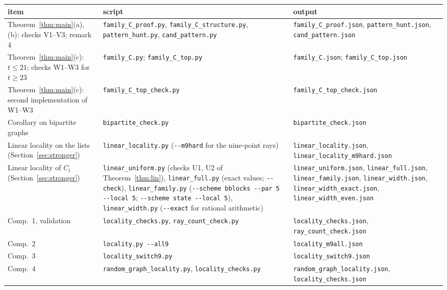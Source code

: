 \documentclass[11pt,a4paper]{article}
\theoremstyle{definition}
\theoremstyle{remark}
\newcommand{\file}[1]{\texttt{#1}}
\begin{document}
{\small\raggedright
\begin{center}
\begin{tabular}{@{}>{\raggedright\arraybackslash}p{}>{\raggedright\arraybackslash}p{}>{\raggedright\arraybackslash}p{}@{}}
\toprule
item & script & output \\
\midrule
Theorem~\ref{thm:main}(a), (b): checks V1--V3; remark 4 &
  \file{family\_C\_proof.py}, \file{family\_C\_structure.py}, \file{pattern\_hunt.py}, \file{cand\_pattern.py} &
  \file{family\_C\_proof.json}, \file{pattern\_hunt.json}, \file{cand\_pattern.json} \\
Theorem~\ref{thm:main}(c): $t \le 21$; checks W1--W3 for $t \ge 23$ &
  \file{family\_C.py}; \file{family\_C\_top.py} & \file{family\_C.json}; \file{family\_C\_top.json} \\
Theorem~\ref{thm:main}(c): second implementation of W1--W3 &
  \file{family\_C\_top\_check.py} & \file{family\_C\_top\_check.json} \\
Corollary on bipartite graphs & \file{bipartite\_check.py} & \file{bipartite\_check.json} \\
Linear locality on the lists (Section~\ref{sec:stronger}) & \file{linear\_locality.py} (\file{-{}-m9hard} for the
  nine-point rays) & \file{linear\_locality.json}, \file{linear\_locality\_m9hard.json} \\
Linear locality of $C_t$ (Section~\ref{sec:stronger}) & \file{linear\_uniform.py} (checks U1, U2 of Theorem~\ref{thm:lin}), \file{linear\_full.py} (exact values; \file{-{}-check}), \file{linear\_family.py} (\file{-{}-scheme bblocks -{}-par 5 -{}-local 5}; \file{-{}-scheme state -{}-local 5}), \file{linear\_width.py} (\file{-{}-exact} for rational arithmetic) & \file{linear\_uniform.json}, \file{linear\_full.json}, \file{linear\_family.json}, \file{linear\_width.json}, \file{linear\_width\_exact.json}, \file{linear\_width\_even.json} \\
Comp.~1, validation & \file{locality\_checks.py}, \file{ray\_count\_check.py} &
  \file{locality\_checks.json}, \file{ray\_count\_check.json} \\
Comp.~2 & \file{locality.py -{}-all9} & \file{locality\_m9all.json} \\
Comp.~3 & \file{locality\_switch9.py} & \file{locality\_switch9.json} \\
Comp.~4 & \file{random\_graph\_locality.py}, \file{locality\_checks.py} &
  \file{random\_graph\_locality.json}, \file{locality\_checks.json} \\

\end{tabular}
\end{center}}
\end{document}
